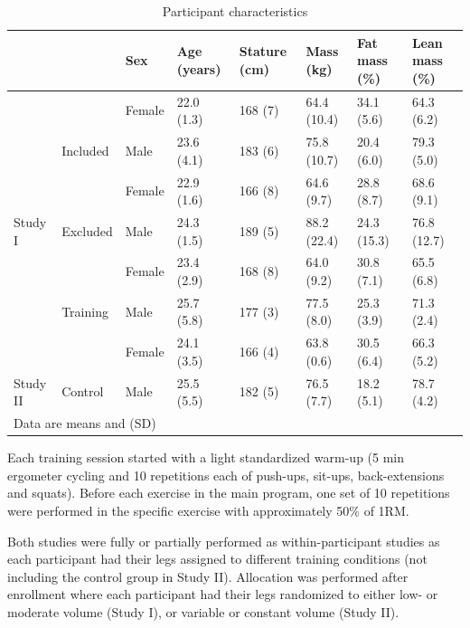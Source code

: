 \documentclass[twoside,10pt]{gihclass} %
\begin{document}
\begin{table}

\caption{\label{tab:characteristics-table}Participant characteristics}
\centering
\fontsize{7}{9}\selectfont
\begin{tabular}[t]{llllllll}
\toprule
  &   & Sex & Age (years) & Stature
(cm) & Mass (kg) & Fat mass (\%) & Lean mass (\%)\\
\midrule
 &  & Female & 22.0 (1.3) & 168 (7) & 64.4 (10.4) & 34.1 (5.6) & 64.3 (6.2)\\
\cmidrule{3-8}
 & \multirow{-2}{*}{\raggedright\arraybackslash Included} & Male & 23.6 (4.1) & 183 (6) & 75.8 (10.7) & 20.4 (6.0) & 79.3 (5.0)\\
\cmidrule{2-8}
 &  & Female & 22.9 (1.6) & 166 (8) & 64.6 (9.7) & 28.8 (8.7) & 68.6 (9.1)\\
\cmidrule{3-8}
\multirow{-4}{*}{\raggedright\arraybackslash Study I} & \multirow{-2}{*}{\raggedright\arraybackslash Excluded} & Male & 24.3 (1.5) & 189 (5) & 88.2 (22.4) & 24.3 (15.3) & 76.8 (12.7)\\
\cmidrule{1-8}
 &  & Female & 23.4 (2.9) & 168 (8) & 64.0 (9.2) & 30.8 (7.1) & 65.5 (6.8)\\
\cmidrule{3-8}
 & \multirow{-2}{*}{\raggedright\arraybackslash Training} & Male & 25.7 (5.8) & 177 (3) & 77.5 (8.0) & 25.3 (3.9) & 71.3 (2.4)\\
\cmidrule{2-8}
 &  & Female & 24.1 (3.5) & 166 (4) & 63.8 (0.6) & 30.5 (6.4) & 66.3 (5.2)\\
\cmidrule{3-8}
\multirow{-4}{*}{\raggedright\arraybackslash Study II} & \multirow{-2}{*}{\raggedright\arraybackslash Control} & Male & 25.5 (5.5) & 182 (5) & 76.5 (7.7) & 18.2 (5.1) & 78.7 (4.2)\\
\bottomrule
\multicolumn{8}{l}{\rule{0pt}{1em}Data are means and (SD)}\\
\end{tabular}
\end{table}
Each training session started with a light standardized warm-up (5 min ergometer cycling and 10 repetitions each of push-ups, sit-ups, back-extensions and squats). Before each exercise in the main program, one set of 10 repetitions were performed in the specific exercise with approximately 50\% of 1RM.

Both studies were fully or partially performed as within-participant studies as each participant had their legs assigned to different training conditions (not including the control group in Study II). Allocation was performed after enrollment where each participant had their legs randomized to either low- or moderate volume (Study I), or variable or constant volume (Study II).
\end{document}
